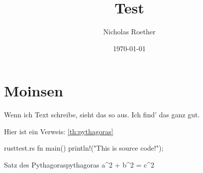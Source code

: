 \documentclass[de]{fancy_article}
\title{Test}
\author{Nicholas Roether}
\date{\today}
\begin{document}
\begin{titlepage}
\maketitle
\end{titlepage}

\tableofcontents

\section{Moinsen}

Wenn ich Text schreibe, sieht das so aus. Ich find' das ganz gut.

Hier ist ein Verweis: \ref{th:pythagoras}

\begin{codefile}{rust}{test.rs}
fn main() {
	println!("This is source code!");
}
\end{codefile}

\begin{theorem}{Satz des Pythagoras}{pythagoras}
	a^2 + b^2 = c^2
\end{theorem}
\end{document}
